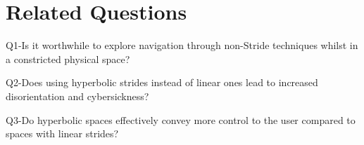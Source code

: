 \section{Related Questions}

Q1-Is it worthwhile to explore navigation through non-Stride techniques whilst in a constricted physical space?

Q2-Does using hyperbolic strides instead of linear ones lead to increased disorientation and cybersickness?

Q3-Do hyperbolic spaces effectively convey more control to the user compared to spaces with linear strides?


\newcommand{\Overleaf}{\href{https://www.overleaf.com?r=f5160636&rm=d&rs=b}{Overleaf}}